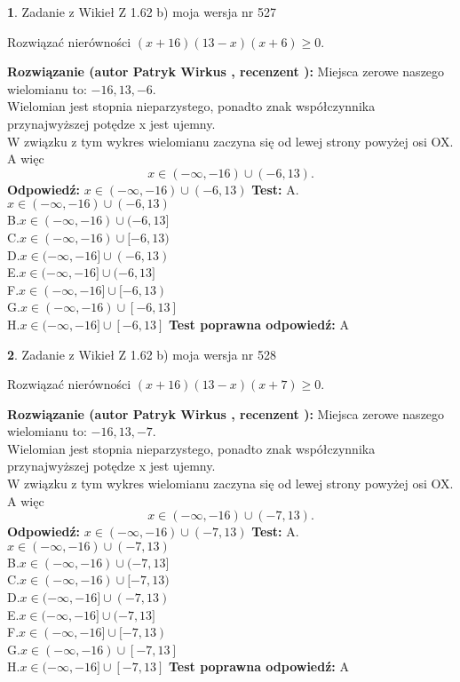 \documentclass[12pt, a4paper]{article}
\theoremstyle{definition} %
\newtheorem{zad}{}
\newcommand{\zadStart}[1]{\begin{zad}#1\newline}
\newcommand{\zadStop}{\end{zad}}
\newcommand{\rozwStart}[2]{\noindent \textbf{Rozwiązanie (autor #1 , recenzent #2): }\newline}
\newcommand{\rozwStop}{\newline}
\newcommand{\odpStart}{\noindent \textbf{Odpowiedź:}\newline}
\newcommand{\odpStop}{\newline}
\newcommand{\testStart}{\noindent \textbf{Test:}\newline}
\newcommand{\testStop}{\newline}
\newcommand{\kluczStart}{\noindent \textbf{Test poprawna odpowiedź:}\newline}
\newcommand{\kluczStop}{\newline}
\begin{document}
\zadStart{Zadanie z Wikieł Z 1.62 b) moja wersja nr 527}

Rozwiązać nierówności $(x+16)(13-x)(x+6)\ge0$.
\zadStop
\rozwStart{Patryk Wirkus}{}
Miejsca zerowe naszego wielomianu to: $-16, 13, -6$.\\
Wielomian jest stopnia nieparzystego, ponadto znak współczynnika przy\linebreak najwyższej potędze x jest ujemny.\\ W związku z tym wykres wielomianu zaczyna się od lewej strony powyżej osi OX. A więc $$x \in (-\infty,-16) \cup (-6,13).$$
\rozwStop
\odpStart
$x \in (-\infty,-16) \cup (-6,13)$
\odpStop
\testStart
A.$x \in (-\infty,-16) \cup (-6,13)$\\
B.$x \in (-\infty,-16) \cup (-6,13]$\\
C.$x \in (-\infty,-16) \cup [-6,13)$\\
D.$x \in (-\infty,-16] \cup (-6,13)$\\
E.$x \in (-\infty,-16] \cup (-6,13]$\\
F.$x \in (-\infty,-16] \cup [-6,13)$\\
G.$x \in (-\infty,-16) \cup [-6,13]$\\
H.$x \in (-\infty,-16] \cup [-6,13]$
\testStop
\kluczStart
A
\kluczStop



\zadStart{Zadanie z Wikieł Z 1.62 b) moja wersja nr 528}

Rozwiązać nierówności $(x+16)(13-x)(x+7)\ge0$.
\zadStop
\rozwStart{Patryk Wirkus}{}
Miejsca zerowe naszego wielomianu to: $-16, 13, -7$.\\
Wielomian jest stopnia nieparzystego, ponadto znak współczynnika przy\linebreak najwyższej potędze x jest ujemny.\\ W związku z tym wykres wielomianu zaczyna się od lewej strony powyżej osi OX. A więc $$x \in (-\infty,-16) \cup (-7,13).$$
\rozwStop
\odpStart
$x \in (-\infty,-16) \cup (-7,13)$
\odpStop
\testStart
A.$x \in (-\infty,-16) \cup (-7,13)$\\
B.$x \in (-\infty,-16) \cup (-7,13]$\\
C.$x \in (-\infty,-16) \cup [-7,13)$\\
D.$x \in (-\infty,-16] \cup (-7,13)$\\
E.$x \in (-\infty,-16] \cup (-7,13]$\\
F.$x \in (-\infty,-16] \cup [-7,13)$\\
G.$x \in (-\infty,-16) \cup [-7,13]$\\
H.$x \in (-\infty,-16] \cup [-7,13]$
\testStop
\kluczStart
A
\kluczStop
\end{document}
